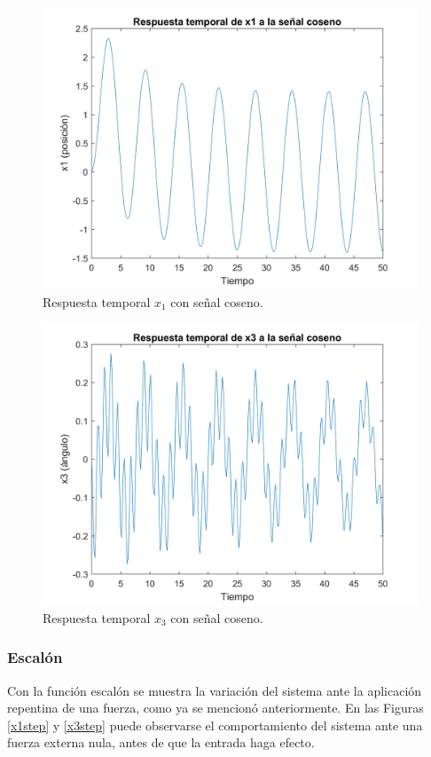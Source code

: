 \documentclass[journal]{IEEEtran}
\begin{document}
\begin{figure}[ht!]
\caption{Respuesta temporal $x_1$ con señal coseno.\label{x1cos}}
  \centering
\includegraphics[scale=0.18]{figures/x1cos.png}
\end{figure}

\begin{figure}[ht!]
\caption{Respuesta temporal $x_3$ con señal coseno.\label{x3cos}}
  \centering
\includegraphics[scale=0.18]{figures/x3cos.png}
\end{figure}

\subsubsection*{Escalón}
Con la función escalón se muestra la variación del sistema ante la aplicación repentina de una fuerza, como ya se mencionó anteriormente. En las Figuras \ref{x1step} y \ref{x3step} puede observarse el comportamiento del sistema ante una fuerza externa nula, antes de que la entrada haga efecto. \\
\end{document}
